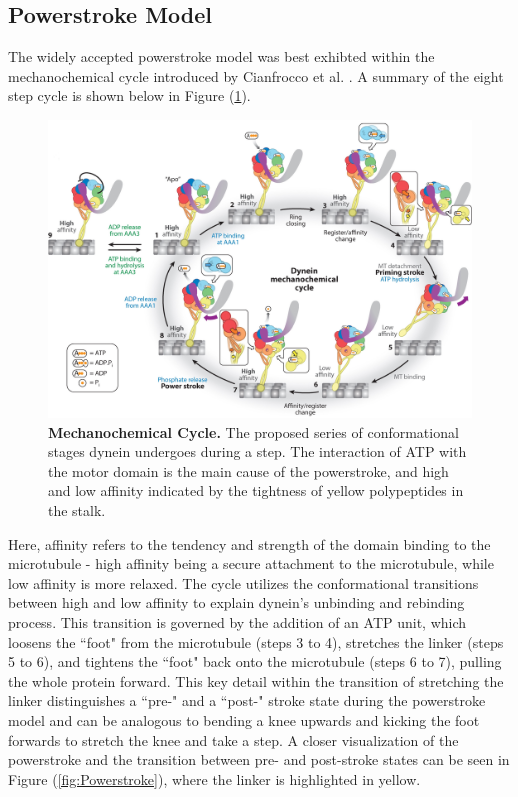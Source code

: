 \subsection{Powerstroke Model}

The widely accepted powerstroke model was best exhibted within the mechanochemical cycle introduced by Cianfrocco et al. \cite{Cianfrocco2015mechanism}. A summary of the eight step cycle is shown below in Figure (\ref{fig:MechanochemicalCycle}).

\begin{figure}[H]
	\centering
	\includegraphics[width=1\columnwidth]{Figures/mechanochemical_cycle.jpeg}
	\caption[Mechanochemical Cycle]{\textbf{Mechanochemical Cycle.} The proposed series of conformational stages dynein undergoes during a step. The interaction of ATP with the motor domain is the main cause of the powerstroke, and high and low affinity indicated by the tightness of yellow polypeptides in the stalk. \cite{Cianfrocco2015mechanism}}
	\label{fig:MechanochemicalCycle}
\end{figure}

Here, affinity refers to the tendency and strength of the domain binding to the microtubule - high affinity being a secure attachment to the microtubule, while low affinity is more relaxed. The cycle utilizes the conformational transitions between high and low affinity to explain dynein's unbinding and rebinding process. This transition is governed by the addition of an ATP unit, which loosens the ``foot" from the microtubule (steps 3 to 4), stretches the linker (steps 5 to 6), and tightens the ``foot" back onto the microtubule (steps 6 to 7), pulling the whole protein forward. This key detail within the transition of stretching the linker distinguishes a ``pre-" and a ``post-" stroke state during the powerstroke model and can be analogous to bending a knee upwards and kicking the foot forwards to stretch the knee and take a step. A closer visualization of the powerstroke and the transition between pre- and post-stroke states can be seen in Figure (\ref{fig:Powerstroke}), where the linker is highlighted in yellow.  

